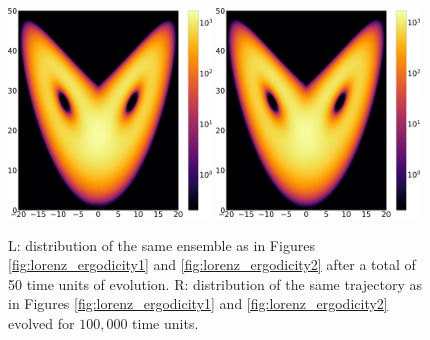 \begin{figure} \centering
\includegraphics[width=0.48\textwidth]{lorenz_trajectory_1000000.0.png}
\hspace{0.02\textwidth}
\includegraphics[width=0.48\textwidth]{lorenz_ensemble_50.png}
\caption{
L: distribution of the same ensemble as in Figures \ref{fig:lorenz_ergodicity1}
and \ref{fig:lorenz_ergodicity2} after a total of 50 time units of evolution.
R: distribution of the same trajectory as in Figures \ref{fig:lorenz_ergodicity1}
and \ref{fig:lorenz_ergodicity2} evolved for $100,000$ time units.
}
\label{fig:lorenz_ergodicity3}
\end{figure}

